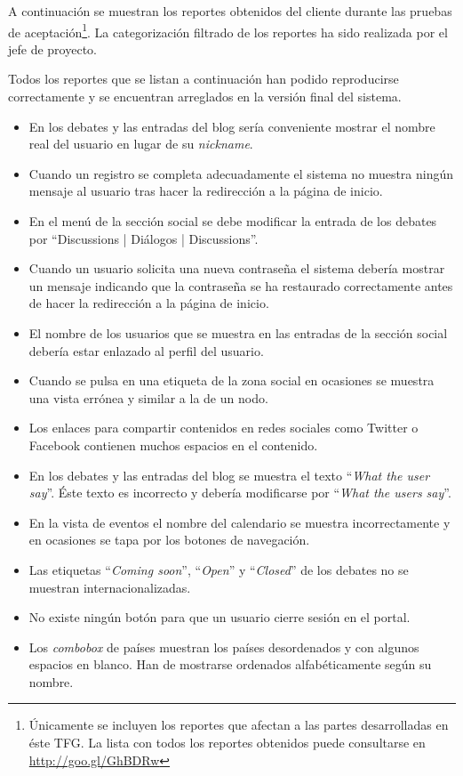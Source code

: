 A continuación se muestran los reportes obtenidos del cliente durante las pruebas de aceptación\footnote{Únicamente se incluyen los reportes que afectan a las partes desarrolladas en éste TFG.  La lista con todos los reportes obtenidos puede consultarse en \url{http://goo.gl/GhBDRw}}.  La categorización filtrado de los reportes ha sido realizada por el jefe de proyecto.

Todos los reportes que se listan a continuación han podido reproducirse correctamente y se encuentran arreglados en la versión final del sistema.
\begin{itemize}
	\item En los debates y las entradas del blog sería conveniente mostrar el nombre real del usuario en lugar de su \textit{nickname}.
	\item Cuando un registro se completa adecuadamente el sistema no muestra ningún mensaje al usuario tras hacer la redirección a la página de inicio.
	\item En el menú de la sección social se debe modificar la entrada de los debates por ``Discussions | Diálogos | Discussions''.
	\item Cuando un usuario solicita una nueva contraseña el sistema debería mostrar un mensaje indicando que la contraseña se ha restaurado correctamente antes de hacer la redirección a la página de inicio.
	\item El nombre de los usuarios que se muestra en las entradas de la sección social debería estar enlazado al perfil del usuario.
	\item Cuando se pulsa en una etiqueta de la zona social en ocasiones se muestra una vista errónea y similar a la de un nodo.
	\item Los enlaces para compartir contenidos en redes sociales como Twitter o Facebook contienen muchos espacios en el contenido.
	\item En los debates y las entradas del blog se muestra el texto ``\textit{What the user say}''.  Éste texto es incorrecto y debería modificarse por ``\textit{What the users say}''.
	\item En la vista de eventos el nombre del calendario se muestra incorrectamente y en ocasiones se tapa por los botones de navegación.
	\item Las etiquetas ``\textit{Coming soon}'', ``\textit{Open}'' y ``\textit{Closed}'' de los debates no se muestran internacionalizadas.
	\item No existe ningún botón para que un usuario cierre sesión en el portal.
	\item Los \textit{combobox} de países muestran los países desordenados y con algunos espacios en blanco.  Han de mostrarse ordenados alfabéticamente según su nombre.

\end{itemize}
